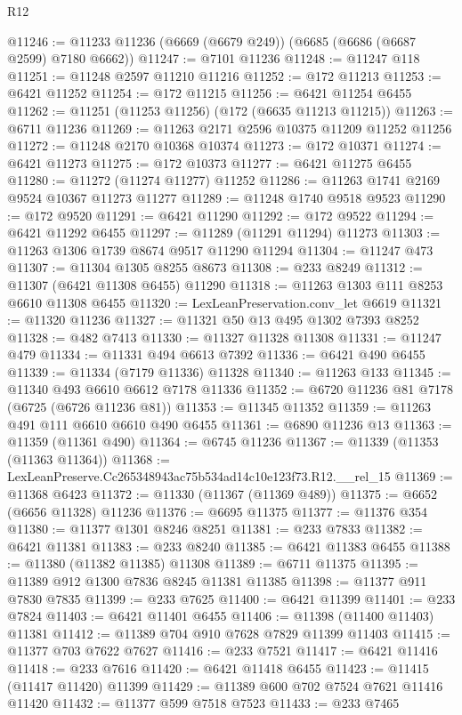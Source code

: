 \begin{lexlean}{R12}
\begin{coremodule}
@11246 := @11233 @11236 (@6669 (@6679 @249)) (@6685 (@6686 (@6687 @2599) @7180 @6662))
@11247 := @7101 @11236
@11248 := @11247 @118
@11251 := @11248 @2597 @11210 @11216
@11252 := @172 @11213
@11253 := @6421 @11252
@11254 := @172 @11215
@11256 := @6421 @11254 @6455
@11262 := @11251 (@11253 @11256) (@172 (@6635 @11213 @11215))
@11263 := @6711 @11236
@11269 := @11263 @2171 @2596 @10375 @11209 @11252 @11256
@11272 := @11248 @2170 @10368 @10374
@11273 := @172 @10371
@11274 := @6421 @11273
@11275 := @172 @10373
@11277 := @6421 @11275 @6455
@11280 := @11272 (@11274 @11277) @11252
@11286 := @11263 @1741 @2169 @9524 @10367 @11273 @11277
@11289 := @11248 @1740 @9518 @9523
@11290 := @172 @9520
@11291 := @6421 @11290
@11292 := @172 @9522
@11294 := @6421 @11292 @6455
@11297 := @11289 (@11291 @11294) @11273
@11303 := @11263 @1306 @1739 @8674 @9517 @11290 @11294
@11304 := @11247 @473
@11307 := @11304 @1305 @8255 @8673
@11308 := @233 @8249
@11312 := @11307 (@6421 @11308 @6455) @11290
@11318 := @11263 @1303 @111 @8253 @6610 @11308 @6455
@11320 := LexLeanPreservation.conv_let @6619
@11321 := @11320 @11236
@11327 := @11321 @50 @13 @495 @1302 @7393 @8252
@11328 := @482 @7413
@11330 := @11327 @11328 @11308
@11331 := @11247 @479
@11334 := @11331 @494 @6613 @7392
@11336 := @6421 @490 @6455
@11339 := @11334 (@7179 @11336) @11328
@11340 := @11263 @133
@11345 := @11340 @493 @6610 @6612 @7178 @11336
@11352 := @6720 @11236 @81 @7178 (@6725 (@6726 @11236 @81))
@11353 := @11345 @11352
@11359 := @11263 @491 @111 @6610 @6610 @490 @6455
@11361 := @6890 @11236 @13
@11363 := @11359 (@11361 @490)
@11364 := @6745 @11236
@11367 := @11339 (@11353 (@11363 @11364))
@11368 := LexLeanPreserve.Cc265348943ac75b534ad14c10e123f73.R12.__rel_15
@11369 := @11368 @6423
@11372 := @11330 (@11367 (@11369 @489))
@11375 := @6652 (@6656 @11328) @11236
@11376 := @6695 @11375
@11377 := @11376 @354
@11380 := @11377 @1301 @8246 @8251
@11381 := @233 @7833
@11382 := @6421 @11381
@11383 := @233 @8240
@11385 := @6421 @11383 @6455
@11388 := @11380 (@11382 @11385) @11308
@11389 := @6711 @11375
@11395 := @11389 @912 @1300 @7836 @8245 @11381 @11385
@11398 := @11377 @911 @7830 @7835
@11399 := @233 @7625
@11400 := @6421 @11399
@11401 := @233 @7824
@11403 := @6421 @11401 @6455
@11406 := @11398 (@11400 @11403) @11381
@11412 := @11389 @704 @910 @7628 @7829 @11399 @11403
@11415 := @11377 @703 @7622 @7627
@11416 := @233 @7521
@11417 := @6421 @11416
@11418 := @233 @7616
@11420 := @6421 @11418 @6455
@11423 := @11415 (@11417 @11420) @11399
@11429 := @11389 @600 @702 @7524 @7621 @11416 @11420
@11432 := @11377 @599 @7518 @7523
@11433 := @233 @7465

\end{coremodule}
\end{lexlean}
